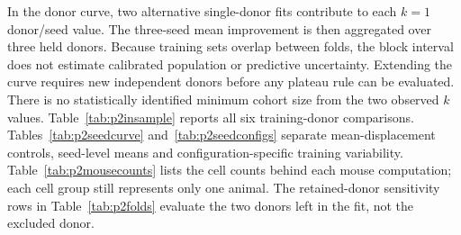 \documentclass[10pt,a4paper]{article}
\begin{document}
In the donor curve, two alternative single-donor fits contribute to each $k=1$ donor/seed value. The three-seed mean improvement is then aggregated over three held donors. Because training sets overlap between folds, the block interval does not estimate calibrated population or predictive uncertainty. Extending the curve requires new independent donors before any plateau rule can be evaluated. There is no statistically identified minimum cohort size from the two observed $k$ values.
Table~\ref{tab:p2insample} reports all six training-donor comparisons. Tables~\ref{tab:p2seedcurve} and~\ref{tab:p2seedconfigs} separate mean-displacement controls, seed-level means and configuration-specific training variability. Table~\ref{tab:p2mousecounts} lists the cell counts behind each mouse computation; each cell group still represents only one animal. The retained-donor sensitivity rows in Table~\ref{tab:p2folds} evaluate the two donors left in the fit, not the excluded donor.
\end{document}

